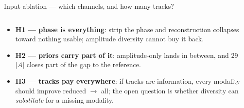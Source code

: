 \begin{frame}{Input ablation --- which channels, and how many tracks?}
\begin{columns}[c]
\begin{column}{0.54\textwidth}
\begin{itemize}
              only / both) $\times$ \emph{how many tracks} (the reduced 5-track
              selection / all 29). Six retrains of the reference U-Net --- same
              $K{=}2$ target, loss and split, only the input stack changes.
        \item \textbf{H1 --- phase is everything}: strip the phase and
              reconstruction collapses toward nothing usable; amplitude
              diversity cannot buy it back.
        \item \textbf{H2 --- priors carry part of it}: amplitude-only lands in
              between, and 29 $|A|$ closes part of the gap to the reference.
        \item \textbf{H3 --- tracks pay everywhere}: if tracks are information,
              every modality should improve reduced $\to$ all; the open question
              is whether diversity can \emph{substitute} for a missing modality.
      \end{itemize}
    \end{column}
  \end{columns}
\end{frame}

